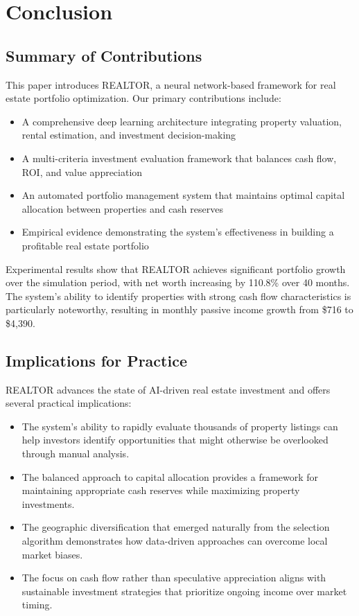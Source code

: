 \documentclass[conference]{IEEEtran}
\begin{document}
\section{Conclusion}

\subsection{Summary of Contributions}
This paper introduces REALTOR, a neural network-based framework for real estate portfolio optimization. Our primary contributions include:

\begin{itemize}
\item A comprehensive deep learning architecture integrating property valuation, rental estimation, and investment decision-making
\item A multi-criteria investment evaluation framework that balances cash flow, ROI, and value appreciation
\item An automated portfolio management system that maintains optimal capital allocation between properties and cash reserves
\item Empirical evidence demonstrating the system's effectiveness in building a profitable real estate portfolio
\end{itemize}

Experimental results show that REALTOR achieves significant portfolio growth over the simulation period, with net worth increasing by 110.8\% over 40 months. The system's ability to identify properties with strong cash flow characteristics is particularly noteworthy, resulting in monthly passive income growth from \$716 to \$4,390.

\subsection{Implications for Practice}
REALTOR advances the state of AI-driven real estate investment and offers several practical implications:

\begin{itemize}
\item The system's ability to rapidly evaluate thousands of property listings can help investors identify opportunities that might otherwise be overlooked through manual analysis.
\item The balanced approach to capital allocation provides a framework for maintaining appropriate cash reserves while maximizing property investments.
\item The geographic diversification that emerged naturally from the selection algorithm demonstrates how data-driven approaches can overcome local market biases.
\item The focus on cash flow rather than speculative appreciation aligns with sustainable investment strategies that prioritize ongoing income over market timing.
\end{itemize}
\end{document}
